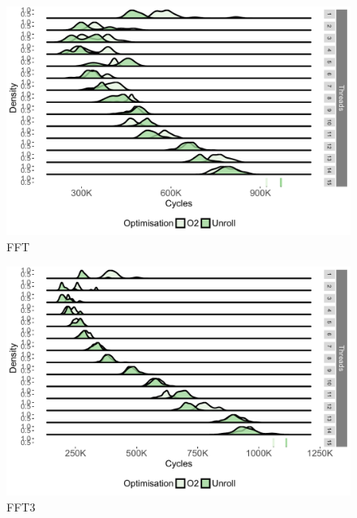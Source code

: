 \begin{appendices}
\begin{figure}[!htb]
\center
\includegraphics[width=1\textwidth]{streamit-paper/graphics/appendixgraphs/fft-total.pdf}
\caption{FFT}\label{chp:stream:ft}
\end{figure}

\begin{figure}[!htb]
\center
\includegraphics[width=1\textwidth]{streamit-paper/graphics/appendixgraphs/fft3-total.pdf}
\caption{FFT3}\label{chp:stream:f3t}
\end{figure}


\end{appendices}
